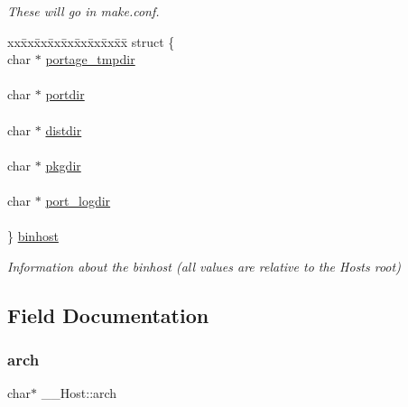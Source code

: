 \begin{DoxyCompactItemize}
\begin{tabbing}
\end{tabbing}\begin{DoxyCompactList}\small\item\em These will go in make.\+conf. \end{DoxyCompactList}\item 
\begin{tabbing}
xx\=xx\=xx\=xx\=xx\=xx\=xx\=xx\=xx\=\kill
struct \{\\
\>char $\ast$ \mbox{\hyperlink{struct_____host_a40e40d3bc778b8f73c312edd7c4c36a8}{portage\_tmpdir}}\\
\>\\
\>char $\ast$ \mbox{\hyperlink{struct_____host_ac4e7738b691197122d5f18069425933a}{portdir}}\\
\>\\
\>char $\ast$ \mbox{\hyperlink{struct_____host_ad108845535e7ae4801e939319b208e52}{distdir}}\\
\>\\
\>char $\ast$ \mbox{\hyperlink{struct_____host_af2be365c35b8cd256780212154c5e639}{pkgdir}}\\
\>\\
\>char $\ast$ \mbox{\hyperlink{struct_____host_a8d9d6cea205f5bdb44284aafb41b9266}{port\_logdir}}\\
\>\\
\} \mbox{\hyperlink{struct_____host_adde139e84a9a3722fee6faab0978568f}{binhost}}\\

\end{tabbing}\begin{DoxyCompactList}\small\item\em Information about the binhost (all values are relative to the Host\textquotesingle{}s root) \end{DoxyCompactList}\end{DoxyCompactItemize}


\subsection{Field Documentation}
\mbox{\label{struct_____host_a781364a501280f6632f702fc1dceb8e4}} 
\subsubsection{\texorpdfstring{arch}{arch}}
{\footnotesize\ttfamily char$\ast$ \+\_\+\+\_\+\+Host\+::arch}



